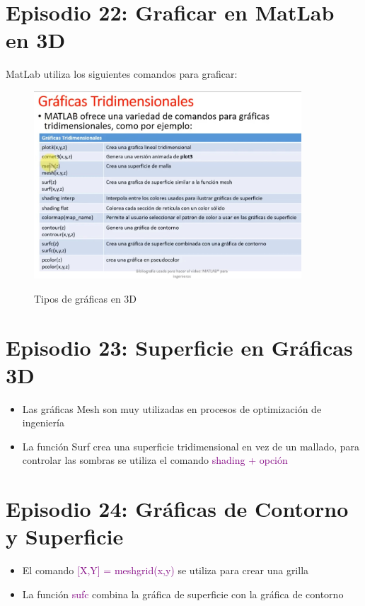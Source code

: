 \documentclass{article}
\begin{document}
	\section{Episodio 22: Graficar en MatLab en 3D}
	
	MatLab utiliza los siguientes comandos para graficar:
	
		\begin{figure}[h!]
		\centering
		\includegraphics[width = 100mm]{imagenes/Funciones/graficas3d}
		\label{3d}
		\caption{Tipos de gráficas en 3D}
	\end{figure}
	
	\section{Episodio 23: Superficie en Gráficas 3D}
	
	\begin{itemize}
		\item Las gráficas Mesh son muy utilizadas en procesos de optimización de ingeniería
		\item La función Surf crea una superficie tridimensional en vez de un mallado, para controlar las sombras se utiliza el comando \textcolor{purple}{shading + opción}
	\end{itemize}

	\section{Episodio 24: Gráficas de Contorno y Superficie}

	\begin{itemize}
		\item El comando \textcolor{purple}{[X,Y] = meshgrid(x,y)} se utiliza para crear una grilla
		\item La función \textcolor{purple}{sufc} combina la gráfica de superficie con la gráfica de contorno
	\end{itemize}
		
\end{document}
